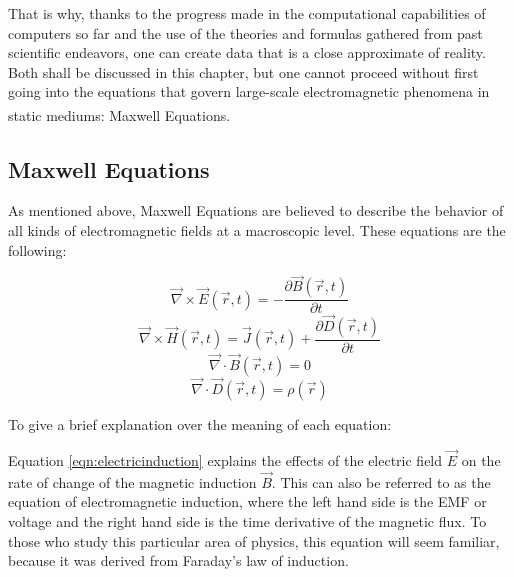 That is why, thanks to the progress made in the computational capabilities of computers so far and the use of the theories and formulas gathered from past scientific endeavors, one can create data that is a close approximate of reality. Both shall be discussed in this chapter, but one cannot proceed without first going into the equations that govern large-scale electromagnetic phenomena in static mediums\textsuperscript{\cite{stratton2007electromagnetic}}: Maxwell Equations.

\subsection{Maxwell Equations}

As mentioned above, Maxwell Equations are believed to describe the behavior of all kinds of electromagnetic fields at a macroscopic level. These equations are the following:

\begin{equation}
	\label{eqn:electricinduction}
	\vec{\nabla} \times \vec{E}(\vec{r},t) = - \frac{\partial \vec{B}(\vec{r},t)}{\partial t}
\end{equation}
\begin{equation}
	\label{eqn:amperesLaw}
	\vec{\nabla} \times \vec{H}(\vec{r},t) = \vec{J}(\vec{r},t) + \frac{\partial \vec{D}(\vec{r},t)}{\partial t}
\end{equation}
\begin{equation}
	\label{eqn:magneticDivergence}
	\vec{\nabla} \cdot \vec{B}(\vec{r},t) = 0
\end{equation}
\begin{equation}
	\label{eqn:gausslaw}
	\vec{\nabla} \cdot \vec{D}(\vec{r},t) = \rho (\vec{r})
\end{equation}

To give a brief explanation over the meaning of each equation:

Equation \ref{eqn:electricinduction} explains the effects of the electric field $\vec{E}$ on the rate of change of the magnetic induction $\vec{B}$. This can also be referred to as the equation of electromagnetic induction, where the left hand side is the EMF or voltage and the right hand side is the time derivative of the magnetic flux. To those who study this particular area of physics, this equation will seem familiar, because it was derived from Faraday's law of induction.

